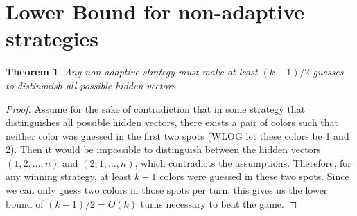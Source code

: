 \documentclass[12pt, a4paper]{article}
\newtheorem{theorem}{Theorem}
\begin{document}
\clearpage
\section*{Lower Bound for non-adaptive strategies}
\begin{theorem}
	Any non-adaptive strategy must make at least $(k-1)/2$ guesses to distinguish all possible hidden vectors.
\end{theorem}
\begin{proof}
	Assume for the sake of contradiction that in some strategy that distinguishes all possible hidden vectors, there exists a pair of colors such that neither color was guessed in the first two spots (WLOG let these colors be 1 and 2). Then it would be impossible to distinguish between the hidden vectors $(1,2,\ldots,n)$ and $(2,1,\ldots,n)$, which contradicts the assumptions. Therefore, for any winning strategy, at least $k-1$ colors were guessed in these two spots. Since we can only guess two colors in those spots per turn, this gives us the lower bound of $(k-1)/2 = O(k)$ turns necessary to beat the game.
\end{proof}
\end{document}
